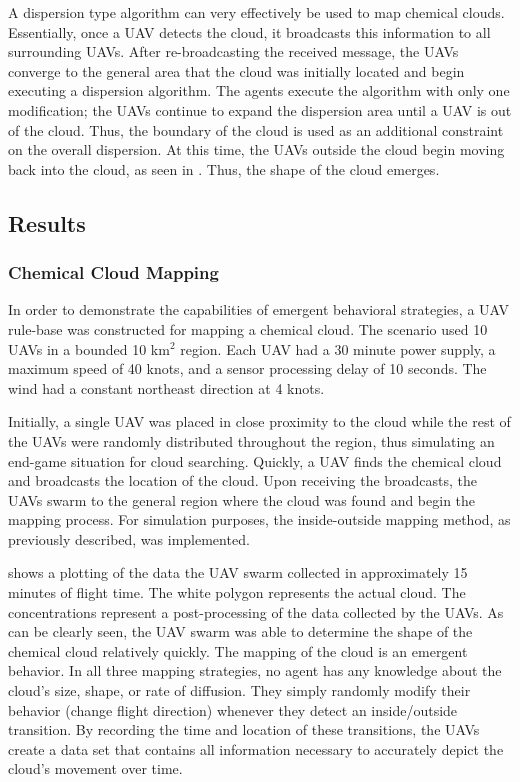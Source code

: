 A dispersion type algorithm can very effectively be used to map chemical clouds. Essentially, once a UAV detects the cloud, it broadcasts this information to all surrounding UAVs. After re-broadcasting the received message, the UAVs converge to the general area that the cloud was initially located and begin executing a dispersion algorithm. The agents execute the algorithm with only one modification; the UAVs continue to expand the dispersion area until a UAV is out of the cloud.  Thus, the boundary of the cloud is used as an additional constraint on the overall dispersion.  At this time, the UAVs outside the cloud begin moving back into the cloud, as seen in . Thus, the shape of the cloud emerges.

\subsection{Results}

\subsubsection{Chemical Cloud Mapping}

In order to demonstrate the capabilities of emergent behavioral strategies, a UAV rule-base was constructed for mapping a chemical cloud. The scenario used 10 UAVs in a bounded 10 km$^{2}$ region.  Each UAV had a 30 minute power supply, a maximum speed of 40 knots, and a sensor processing delay of 10 seconds.  The wind had a constant northeast direction at 4 knots.

Initially, a single UAV was placed in close proximity to the cloud while the rest of the UAVs were randomly distributed throughout the region, thus simulating an end-game situation for cloud searching. Quickly, a UAV finds the chemical cloud and broadcasts the location of the cloud. Upon receiving the broadcasts, the UAVs swarm to the general region where the cloud was found and begin the mapping process. For simulation purposes, the inside-outside mapping method, as previously described, was implemented. 

 shows a plotting of the data the UAV swarm collected in approximately 15 minutes of flight time.  The white polygon represents the actual cloud.  The concentrations represent a post-processing of the data collected by the UAVs.  As can be clearly seen, the UAV swarm was able to determine the shape of the chemical cloud relatively quickly. The mapping of the cloud is an emergent behavior. In all three mapping strategies, no agent has any knowledge about the cloud's size, shape, or rate of diffusion. They simply randomly modify their behavior (change flight direction) whenever they detect an inside/outside transition. By recording the time and location of these transitions, the UAVs create a data set that contains all information necessary to accurately depict the cloud's movement over time. 

